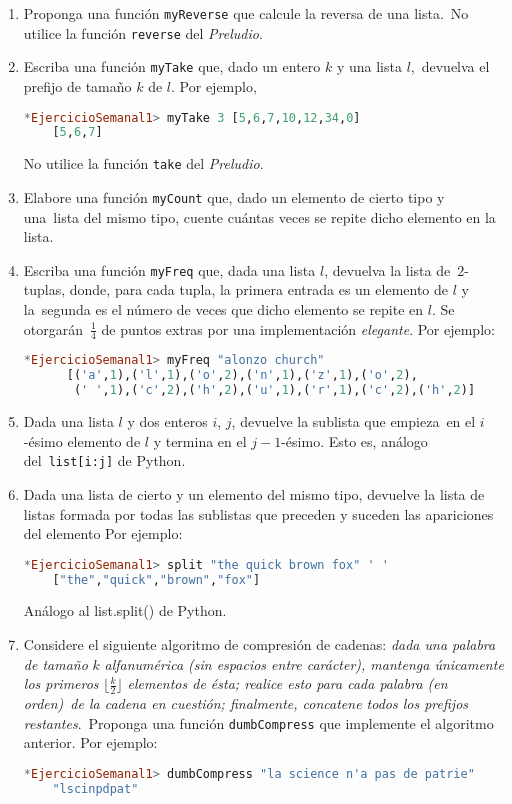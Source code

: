 \documentclass[paper=letter, fontsize=12pt]{scrartcl}
\begin{document}
\begin{enumerate}
\item Proponga una función \verb+myReverse+ que calcule la reversa de una lista.\
  No utilice la función \verb+reverse+ del \emph{Preludio}.
\item Escriba una función \verb+myTake+ que, dado un entero $k$ y una lista $l$,\
  devuelva el prefijo de tamaño $k$ de $l$. Por ejemplo,
  \begin{lstlisting}[language=Haskell]
    *EjercicioSemanal1> myTake 3 [5,6,7,10,12,34,0]
    [5,6,7]
  \end{lstlisting}
  No utilice la función \verb+take+ del \emph{Preludio}.
\item Elabore una función \verb+myCount+ que, dado un elemento de cierto tipo y una\
  lista del mismo tipo, cuente cuántas veces se repite dicho elemento en la lista.
\item Escriba una función \verb+myFreq+ que, dada una lista $l$, devuelva la lista de\
  $2$-tuplas, donde, para cada tupla, la primera entrada es un elemento de $l$ y la\
  segunda es el número de veces que dicho elemento se repite en $l$. Se otorgarán\
  $\frac{1}{4}$ de puntos extras por una implementación \emph{elegante}. Por ejemplo:
    \begin{lstlisting}[language=Haskell]
      *EjercicioSemanal1> myFreq "alonzo church"
      [('a',1),('l',1),('o',2),('n',1),('z',1),('o',2),
       (' ',1),('c',2),('h',2),('u',1),('r',1),('c',2),('h',2)]
    \end{lstlisting}
\item Dada una lista $l$ y dos enteros $i$, $j$, devuelve la sublista que empieza\
  en el $i$-ésimo elemento de $l$ y termina en el $j-1$-ésimo. Esto es, análogo del\
  \verb+list[i:j]+ de Python.
\item Dada una lista de cierto y un elemento del mismo tipo, devuelve la lista de listas
  formada por todas las sublistas que preceden y suceden las apariciones del elemento
  Por ejemplo:
  \begin{lstlisting}[language=Haskell]
    *EjercicioSemanal1> split "the quick brown fox" ' '
    ["the","quick","brown","fox"]
  \end{lstlisting}
  Análogo al list.split() de Python.
\item Considere el siguiente algoritmo de compresión de cadenas: \textit{dada una palabra de tamaño} $k$
  \textit{alfanumérica (sin espacios entre carácter), mantenga únicamente los primeros}
  $\lfloor\frac{k}{2}\rfloor$ \textit{elementos de ésta; realice esto para cada palabra (en orden)}\
  \textit{de la cadena en cuestión; finalmente, concatene todos los prefijos restantes}.\
  Proponga una función \verb+dumbCompress+ que implemente el algoritmo anterior. Por ejemplo:
  \begin{lstlisting}[language=Haskell]
    *EjercicioSemanal1> dumbCompress "la science n'a pas de patrie"
    "lscinpdpat"
  \end{lstlisting}
\end{enumerate}
\end{document}
